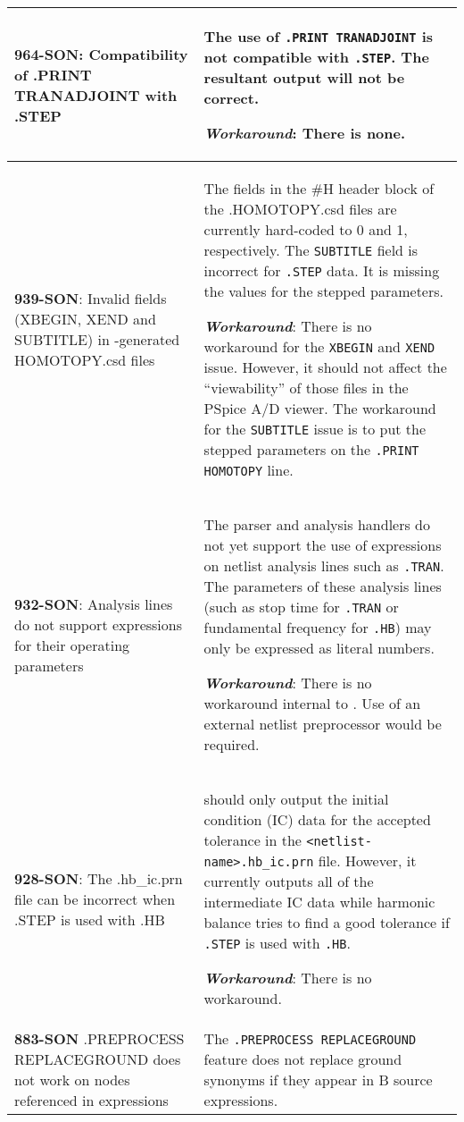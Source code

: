 {\begin{longtable}[h] {>{\raggedright\small}m{2in}|>{\raggedright\let\\\tabularnewline\small}m{3.5in}}
\\ \hline

\textbf{964-SON}: Compatibility of .PRINT TRANADJOINT with .STEP & The use of
\texttt{.PRINT TRANADJOINT} is not compatible with \texttt{.STEP}.  The
resultant \Xyce{} output will not be correct.

\textbf{\textit{Workaround}}: There is none.
\\ \hline

\textbf{939-SON}: Invalid fields (XBEGIN, XEND and SUBTITLE) in \Xyce{}-generated
HOMOTOPY.csd files & The fields in the \#H header block of the
.HOMOTOPY.csd files are currently hard-coded to 0 and 1, respectively.
The \texttt{SUBTITLE} field is incorrect for \texttt{.STEP} data.  It
is missing the values for the stepped parameters.

\textbf{\textit{Workaround}}: There is no workaround for the \texttt{XBEGIN}
and \texttt{XEND} issue.  However, it should not affect the
``viewability'' of those files in the PSpice A/D viewer.  The
workaround for the \texttt{SUBTITLE} issue is to put the stepped
parameters on the \texttt{.PRINT HOMOTOPY} line.
\\ \hline

\textbf{932-SON}: Analysis lines do not support expressions for their
operating parameters & The \Xyce{} parser and analysis handlers do not
yet support the use of expressions on netlist analysis lines such
as \texttt{.TRAN}.  The parameters of these analysis lines (such as
stop time for \texttt{.TRAN} or fundamental frequency
for \texttt{.HB}) may only be expressed as literal numbers.

\textbf{\textit{Workaround}}: There is no workaround internal to \Xyce{}.
Use of an external netlist preprocessor would be required. \\ \hline

\textbf{928-SON}: The .hb\_ic.prn file can be incorrect when .STEP is used
with .HB & \Xyce{} should only output the initial condition (IC) data
for the accepted tolerance in the \texttt{<netlist-name>.hb\_ic.prn}
file.  However, it currently outputs all of the intermediate IC data
while harmonic balance tries to find a good tolerance
if \texttt{.STEP} is used with \texttt{.HB}.

\textbf{\textit{Workaround}}: There is no workaround. \\ \hline

\textbf{883-SON} .PREPROCESS REPLACEGROUND does not work on nodes referenced
in expressions & The \texttt{.PREPROCESS REPLACEGROUND} feature does
not replace ground synonyms if they appear in B source expressions.


\end{longtable}}
